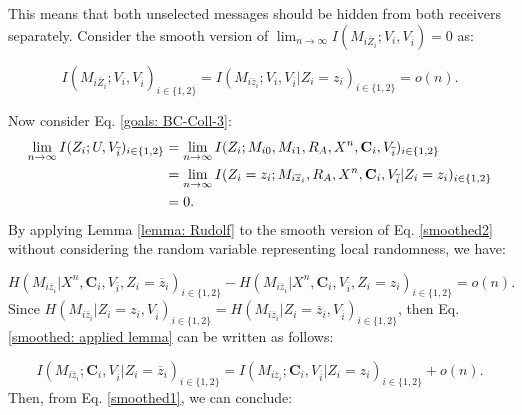 \documentclass[runningheads]{llncs}
\newcommand{\parbreak}{ \vspace{0.3 em}}
\begin{document}
\parbreak This means that both unselected messages should be hidden from both receivers separately. Consider the smooth version of $\lim_{n\rightarrow\infty}I (  M_{i\overline{Z}_i};V_i,V_{\overline{i}}) = 0$ as:

\begin{equation}\label{smoothed1}
    I (  M_{i\overline{Z}_i};V_i,V_{\overline{i}})_{i \in \{1,2\}} = I (  M_{i\overline{z}_i};V_i,V_{\overline{i}}|Z_i = z_i)_{i \in \{1,2\}} = o(n).
\end{equation}


Now consider Eq. \eqref{goals: BC-Coll-3}:
\begin{align}\label{smoothed2}
    \lim_{n\rightarrow\infty}I (Z_i; U, V_{\overline{i}})_{i\in\{1,2\}} & = \lim_{n\rightarrow\infty}I (Z_i; M_{i0}, M_{i1}, R_{A}, X^n , \mathbf{C}_i, V_{\overline{i}})_{i\in\{1,2\}}\notag\\
    & = \lim_{n\rightarrow\infty}I (Z_i=z_i; M_{i\overline{z}_i}, R_{A}, X^n , \mathbf{C}_i, V_{\overline{i}}|Z_i=z_i)_{i\in\{1,2\}}\\
    & = 0.\notag
\end{align}
By applying Lemma \ref{lemma: Rudolf} to the smooth version of Eq. \eqref{smoothed2} without considering the random variable representing local randomness, we have:

\begin{equation}\label{smoothed: applied lemma}
    H(M_{i\overline{z}_i}| X^n, \mathbf{C}_i, V_{\overline{i}},Z_i = \overline{z}_i)_{i\in\{1,2\}} - H(M_{i\overline{z}_i}| X^n, \mathbf{C}_i, V_{\overline{i}}, Z_i = z_i)_{i\in\{1,2\}} = o(n).
\end{equation}
Since $H(M_{i\overline{z}_i}|Z_i=z_i, V_{\overline{i}})_{i\in\{1,2\}} = H(M_{i\overline{z}_i}|Z_i=\overline{z}_i, V_{\overline{i}})_{i\in\{1,2\}}$, then Eq. \eqref{smoothed: applied lemma} can be written as follows:

\begin{equation}
    I(M_{i\overline{z}_i};\mathbf{C}_i, V_{\overline{i}}|Z_i = \overline{z}_i)_{i\in\{1,2\}} = I(M_{i\overline{z}_i};\mathbf{C}_i, V_{\overline{i}}|Z_i = z_i)_{i\in\{1,2\}} + o(n).
\end{equation}
Then, from Eq. \eqref{smoothed1}, we can conclude: 
\end{document}
